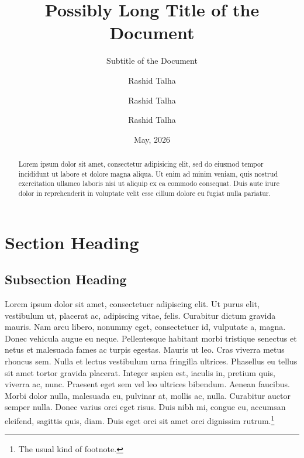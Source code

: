 \documentclass[11pt]{penrose}
\begin{document}
\title[Short Custom Title]{Possibly Long Title of the Document}

\subtitle{Subtitle of the Document}

\author[*,5]{Rashid Talha}
\author{Rashid Talha}
\author[5]{Rashid Talha}


\date{May, 2026}

\maketitle %

\begin{abstract}
  Lorem ipsum dolor sit amet, consectetur adipisicing elit, sed do eiusmod tempor incididunt ut labore et dolore magna aliqua. Ut enim ad minim veniam, quis nostrud exercitation ullamco laboris nisi ut aliquip ex ea commodo consequat. Duis aute irure dolor in reprehenderit in voluptate velit esse cillum dolore eu fugiat nulla pariatur.
\end{abstract}

\tableofcontents

\section{Section Heading}
\subsection{Subsection Heading}
Lorem ipsum dolor sit amet, consectetuer adipiscing elit. Ut purus elit, vestibulum ut, placerat ac, adipiscing vitae, felis. Curabitur dictum gravida mauris. Nam arcu libero, nonummy eget, consectetuer id, vulputate a, magna. Donec vehicula augue eu neque. Pellentesque habitant morbi tristique senectus et netus et malesuada fames ac turpis egestas. Mauris ut leo. Cras viverra metus rhoncus sem. Nulla et lectus vestibulum urna fringilla ultrices. Phasellus eu tellus sit amet tortor gravida placerat. Integer sapien est, iaculis in, pretium quis, viverra ac, nunc. Praesent eget sem vel leo ultrices bibendum. Aenean faucibus. Morbi dolor nulla, malesuada eu, pulvinar at, mollis ac, nulla. Curabitur auctor semper nulla. Donec varius orci eget risus. Duis nibh mi, congue eu, accumsan eleifend, sagittis quis, diam. Duis eget orci sit amet orci dignissim rutrum.\footnote{The usual kind of footnote.}
\end{document}
